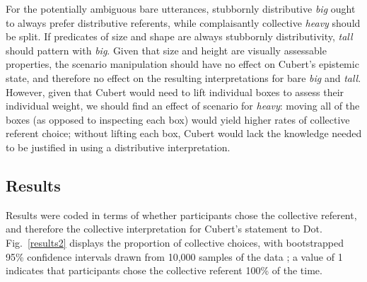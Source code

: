 \documentclass[preprint,12pt,authoryear,titlepage]{elsarticle}
\begin{document}
For the potentially ambiguous bare utterances, stubbornly distributive \emph{big} ought to always prefer distributive referents, while complaisantly collective \emph{heavy} should be split. If predicates of size and shape are always stubbornly distributivity, \emph{tall} should pattern with \emph{big}. Given that size and height are visually assessable properties, the scenario manipulation should have no effect on Cubert's epistemic state, and therefore no effect on the resulting interpretations for bare \emph{big} and \emph{tall}. 
However, given that Cubert would need to lift individual boxes to assess their individual weight, we should find an effect of scenario for \emph{heavy}: moving all of the boxes (as opposed to inspecting each box) would yield higher rates of collective referent choice; without lifting each box, Cubert would lack the knowledge needed to be justified in using a distributive interpretation.

\subsection{Results}

Results were coded in terms of whether participants chose the collective referent, and therefore the collective interpretation for Cubert's statement to Dot. Fig.\ \ref{results2} displays the proportion of collective choices, with bootstrapped 95\% confidence intervals drawn from 10,000 samples of the data \citep{diciccioefron1996}; a value of 1 indicates that participants chose the collective referent 100\% of the time.
\end{document}
